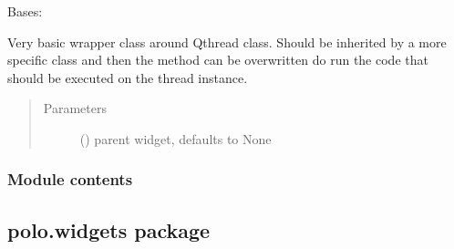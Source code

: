 \documentclass[letterpaper,10pt,english]{sphinxmanual}
\begin{document}
\begin{fulllineitems}
\label{\detokenize{polo.threads:polo.threads.thread.thread}}
Bases: 

Very basic wrapper class around Qthread class. Should be
inherited by a more specific class and then the  method
can be overwritten do run the code that should be executed on the
thread instance.
\begin{quote}\begin{description}
\item[{Parameters}] \leavevmode
{} (\sphinxstyleliteralemphasis{\sphinxupquote{, }}) \textendash{} parent widget, defaults to None

\end{description}\end{quote}

\begin{fulllineitems}
\label{\detokenize{polo.threads:polo.threads.thread.thread.run}}
\end{fulllineitems}


\end{fulllineitems}



\subsubsection{Module contents}
\label{\detokenize{polo.threads:module-polo.threads}}\label{\detokenize{polo.threads:module-contents}}

\subsection{polo.widgets package}
\label{\detokenize{polo.widgets:polo-widgets-package}}\label{\detokenize{polo.widgets::doc}}
\end{document}
